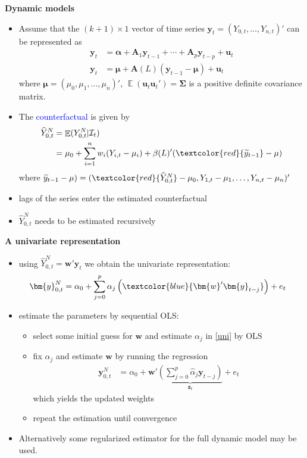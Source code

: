\documentclass{beamer}
\def\E{\mathop{\mathbb{E}}\limits}
\newcommand{\blue}[1]{\textcolor{blue}{#1}}
\newcommand{\red}[1]{\textcolor{red}{#1}}
\begin{document}
\begin{frame}{\bf Dynamic models}

\begin{itemize}
\item Assume that the $(k+1) \times 1$ vector of time series $\bm{y}_t=(Y_{0,t},\ldots,Y_{n,t})'$ can be represented as
{\small \begin{align*}
\bm{y}_t &= \bm{\alpha} + \bm{A}_1 \bm{y}_{t-1} + \cdots + \bm{A}_p \bm{y}_{t-p} + \bm{u}_t \\
\bm{y}_t &= \bm{\mu} + \bm{A}(L)(\bm{y}_{t-1}-\bm{\mu}) + \bm{u}_t
\end{align*} }
where $\bm{\mu}=(\mu_0,\mu_1,\ldots,\mu_n)'$, $\E(\bm{u}_t \bm{u}_t')=\bm{\Sigma}$ is a positive definite covariance matrix.
\item The \blue{counterfactual} is given by
{\small \begin{align*}
\widehat Y_{0,t}^N &= \E( Y_{0,t}^N|{\cal I}_t ) \notag \\
&= \mu_0 + \sum_{i=1}^n w_i (Y_{i,t}-\mu_i) + \beta(L)'(\red{\widetilde y_{t-1}}-\mu)
\end{align*} }
where $\widetilde y_{t-1}-\mu) =(\red{\widehat Y_{0,t}^N} -\mu_0,Y_{1,t}-\mu_1,\ldots,Y_{n,t}-\mu_n)'$
\item lags of the series enter the estimated counterfactual
\item $\widehat Y_{0,t}^N$ needs to be estimated recursively
\end{itemize}
\end{frame}

\begin{frame}{\bf A univariate representation}

\begin{itemize}
\item using $\widehat Y_{0,t}^N = \bm{w}'\bm{y}_t$ we obtain the univariate representation:
{\small \begin{align}
\bm{y}_{0,t}^N &= \alpha_0 + \sum_{j=0}^p \alpha_j \left( \blue{ \bm{w}'\bm{y}_{t-j}} \right) + e_t \label{uni}
\end{align} }
\item estimate the parameters by sequential OLS:
\begin{itemize}
\item select some initial guess for $\bm{w}$ and estimate $\alpha_j$ in \eqref{uni} by OLS
\item fix $\alpha_j$ and estimate $\bm{w}$ by running the regression
{\small \begin{align*}
\bm{y}_{0,t}^N &= \alpha_0 + \bm{w}' \underbrace{ \left(  \sum_{j=0}^p \widehat \alpha_j \bm{y}_{t-j} \right)}_{ \mathbf{z}_t }  + e_t
\end{align*} }
 which yields the updated weights
\item repeat the estimation until convergence
\end{itemize}
\item Alternatively some regularized estimator for the full dynamic model may be used.
\end{itemize}
\end{frame}
\end{document}
